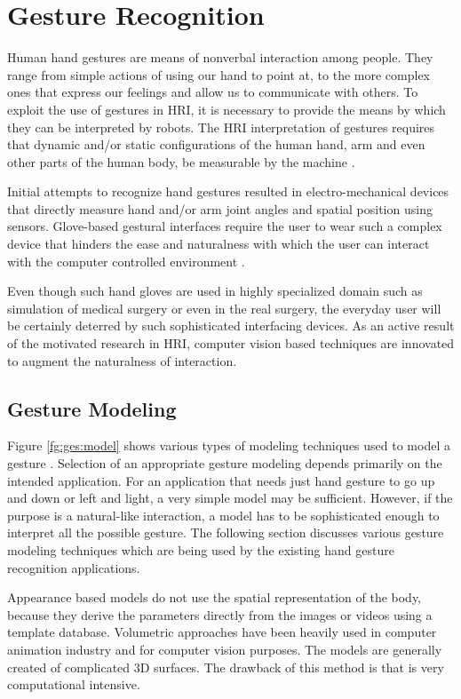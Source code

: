\section{Gesture Recognition} Human hand gestures are means of nonverbal interaction among people. They range from simple actions of using our hand to point at, to the more complex ones that express our feelings and allow us to communicate with others. To exploit the use of gestures in HRI, it is necessary to provide the means by which they can be interpreted by robots. The HRI interpretation of gestures requires that dynamic and/or static configurations of the human hand, arm and even other parts of the human body, be measurable by the machine \cite{2}. 

Initial attempts to recognize hand gestures resulted in electro-mechanical devices that directly measure hand and/or arm joint angles and spatial position using sensors. Glove-based gestural interfaces require the user to wear such a complex device that hinders the ease and naturalness with which the user can interact with the computer controlled environment \cite{10}. 

Even though such hand gloves are used in highly specialized domain such as simulation of medical surgery or even in the real surgery, the everyday user will be certainly deterred by such sophisticated interfacing devices. As an active result of the motivated research in HRI, computer vision based techniques are innovated to augment the naturalness of interaction.

\subsection{Gesture Modeling} Figure \ref{fg:ges:model} shows various types of modeling techniques used to model a gesture \cite{2}. Selection of an appropriate gesture modeling depends primarily on the intended application. For an application that needs just hand gesture to go up and down or left and light, a very simple model may be sufficient. However, if the purpose is a natural-like interaction, a model has to be sophisticated enough to interpret all the possible gesture. The following section discusses various gesture modeling techniques which are being used by the existing hand gesture recognition applications. 



Appearance based models do not use the spatial representation of the body, because they derive the parameters directly from the images or videos using a template database. Volumetric approaches have been heavily used in computer animation industry and for computer vision purposes. The models are generally created of complicated 3D surfaces. The drawback of this method is that is very computational intensive. 

